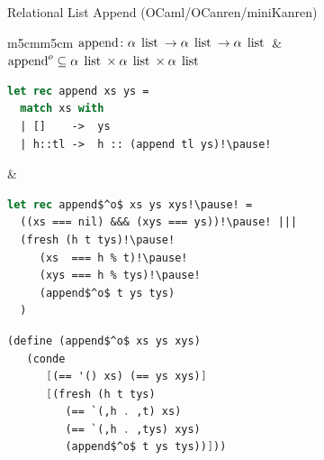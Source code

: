 \documentclass[10pt, mathserif]{beamer}
\let\\\tabularnewline
\let\\\tabularnewline
\newcommand{\oo}[1]{{#1}^o}
\newcommand{\inml}[1]{\mbox{\lstinline{#1}}}
\newcommand{\graybox}[1]{\colorbox{light-gray}{#1}}
\theoremstyle{definition}
\begin{document}
\begin{frame}[fragile]{Relational List Append (OCaml/OCanren/miniKanren)}
\vskip5mm
\begin{tabular}{m{5cm}m{5cm}}
 \graybox{$\inml{append} \colon \alpha\:\inml{list} \to \alpha\:\inml{list} \to \alpha\:\inml{list}$} &
 \graybox{$\oo{\inml{append}}\subseteq\alpha\:\inml{list}\times\alpha\:\inml{list}\times\alpha\:\inml{list}$}\\
 \begin{lstlisting}[language=ocaml] 
let rec append xs ys = 
  match xs with
  | []    ->  ys
  | h::tl ->  h :: (append tl ys)!\pause!
 \end{lstlisting} &
 \begin{lstlisting}[mathescape=true,language=ocaml]
let rec append$^o$ xs ys xys!\pause! = 
  ((xs === nil) &&& (xys === ys))!\pause! |||  
  (fresh (h t tys)!\pause!
     (xs  === h % t)!\pause! 
     (xys === h % tys)!\pause!
     (append$^o$ t ys tys)
  ) 
 \end{lstlisting}
\end{tabular}\pause
\begin{center}
\begin{minipage}{6cm}
\begin{lstlisting}[mathescape=true,language=scheme]
(define (append$^o$ xs ys xys) 
   (conde 
      [(== '() xs) (== ys xys)]
      [(fresh (h t tys)
         (== `(,h . ,t) xs)
         (== `(,h . ,tys) xys)
         (append$^o$ t ys tys))]))
\end{lstlisting}
\end{minipage}
\end{center}
\vskip5mm
\end{frame}
\end{document}
